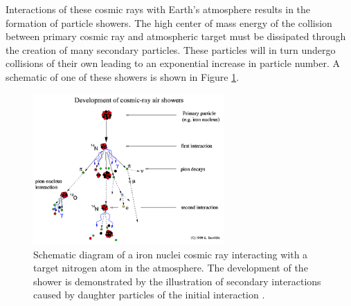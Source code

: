 \documentclass{gatech-thesis}
\begin{document}
Interactions of these cosmic rays with Earth's atmosphere results in the formation of particle showers. The high center of mass energy of the collision between primary cosmic ray and atmospheric target must be dissipated through the creation of many secondary particles. These particles will in turn undergo collisions of their own leading to an exponential increase in particle number. A schematic of one of these showers is shown in Figure \ref{fig:CRSketch}. 
\begin{figure}[ht]
  \begin{center}
    \includegraphics[width=0.65\textwidth,keepaspectratio]{CRsketch.png}
  \end{center}
  \caption[Cosmic Ray Interaction Diagram]{Schematic diagram of a iron nuclei cosmic ray interacting with a target nitrogen atom in the atmosphere. The development of the shower is demonstrated by the illustration of secondary interactions caused by daughter particles of the initial interaction \cite{HiSPARC}.}
  \label{fig:CRSketch}
\end{figure}
\end{document}
